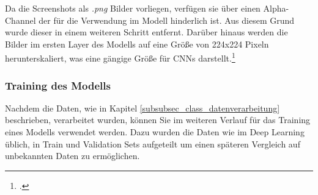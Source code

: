 Da die Screenshots als \textit{.png} Bilder vorliegen, verfügen sie über einen Alpha-Channel der für die Verwendung im Modell hinderlich ist.
Aus diesem Grund wurde dieser in einem weiteren Schritt entfernt.
Darüber hinaus werden die Bilder im ersten Layer des Modells auf eine Größe von 224x224 Pixeln herunterskaliert, was eine gängige Größe für \aclp{CNN} darstellt.\footcite[\vglf][]{ghosh2019}


\subsubsection{Training des Modells} \label{subsubsec_class_training}
Nachdem die Daten, wie in Kapitel \ref{subsubsec_class_datenverarbeitung} beschrieben, verarbeitet wurden, können Sie im weiteren Verlauf für das Training eines Modells verwendet werden.
Dazu wurden die Daten wie im Deep Learning üblich, in Train und Validation Sets aufgeteilt um einen späteren Vergleich auf unbekannten Daten zu ermöglichen.
